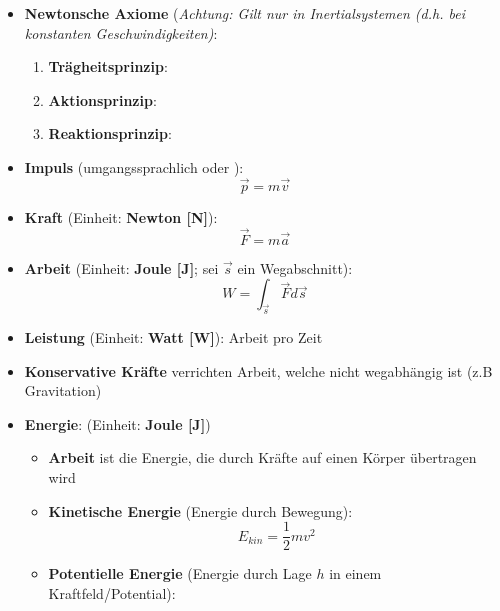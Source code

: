 \begin{itemize}
	\item \textbf{Newtonsche Axiome} (\textit{Achtung: Gilt nur in Inertialsystemen (d.h. bei konstanten Geschwindigkeiten)}:
	\begin{enumerate}
		\item \textbf{Trägheitsprinzip}: 
		\item \textbf{Aktionsprinzip}: 
		\item \textbf{Reaktionsprinzip}: 
	\end{enumerate}
	\item \textbf{Impuls} (umgangssprachlich  oder ):
	\begin{equation}
		\vec{p} = m\vec{v}
	\end{equation}
	\item \textbf{Kraft} (Einheit: \textbf{Newton [N]}):
	\begin{equation}
		\vec{F} = m\vec{a}
	\end{equation}
	\item \textbf{Arbeit} (Einheit: \textbf{Joule [J]}; sei $\vec{s}$ ein Wegabschnitt):
	\begin{equation}
		W = \int_{\vec{s}} \vec{F}d\vec{s}
	\end{equation}
	\item \textbf{Leistung} (Einheit: \textbf{Watt [W]}): Arbeit pro Zeit
	\item \textbf{Konservative Kräfte} verrichten Arbeit, welche nicht wegabhängig ist (z.B Gravitation)
	\item \textbf{Energie}: (Einheit: \textbf{Joule [J]})
	\begin{itemize}
		\item \textbf{Arbeit} ist die Energie, die durch Kräfte auf einen Körper übertragen wird
		\item \textbf{Kinetische Energie} (Energie durch Bewegung):
		\begin{equation}
			E_{kin} = \frac{1}{2}mv^2
		\end{equation}
		\item \textbf{Potentielle Energie} (Energie durch Lage $h$ in einem Kraftfeld/Potential):

\end{itemize}
\end{itemize}
